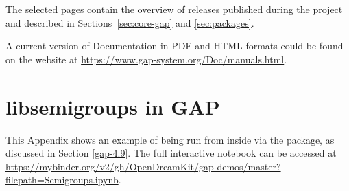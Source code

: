 \documentclass{deliverablereport}
\begin{document}
The selected pages contain the overview of \GAP releases published
during the project and described in Sections~\ref{sec:core-gap} and \ref{sec:packages}.

A current version of \GAP Documentation in PDF and HTML formats
could be found on the \GAP website at \url{https://www.gap-system.org/Doc/manuals.html}.





\section{libsemigroups in GAP}
\label{sec:libsemigroups-notebook}

This Appendix shows an example of  being run from inside
\GAP via the  package, as discussed in Section \ref{gap-4.9}.
The full interactive notebook can be accessed at
\url{https://mybinder.org/v2/gh/OpenDreamKit/gap-demos/master?filepath=Semigroups.ipynb}.

\vspace{1.0em}
\end{document}
